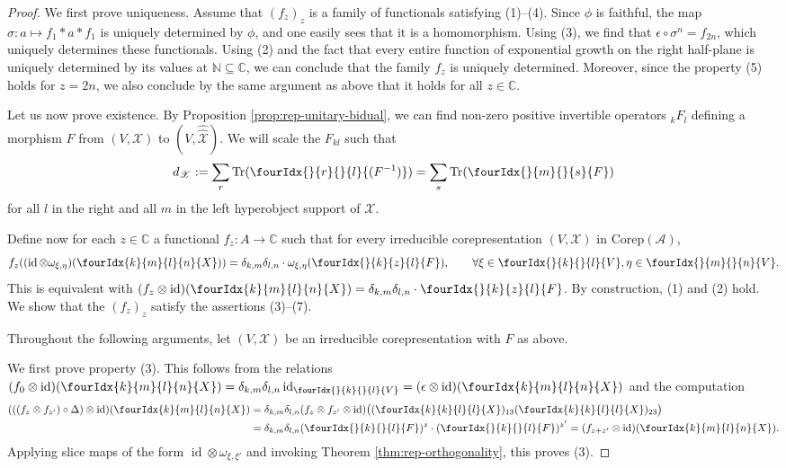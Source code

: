\documentclass[10pt]{article}
\DeclareMathOperator{\id}{id}
\newcommand{\dualco}[1]{\hat{#1}}
\newcommand{\Corep}{\mathrm{Corep}}
\newcommand{\C}{\mathbb{C}}
\newcommand{\N}{\mathbb{N}}
\newcommand{\Tr}{\mathrm{Tr}}
\newcommand{\GrDA}[3]{{}_{#2}#1_{#3}} %
\newcommand{\Gr}[5]{\fourIdx{#2}{#4}{#3}{#5}{#1}}%
\newcommand{\Gru}[3]{\Gr{#1}{}{}{#2}{#3}}
\theoremstyle{definition}
\numberwithin{equation}{section}
\begin{document}
\begin{proof}
  We first prove uniqueness.  Assume that $(f_{z})_{z}$ is a family of
  functionals satisfying (1)--(4).  Since $\phi$ is faithful, the map
  $\sigma\colon a \mapsto f_{1} \ast a \ast f_{1}$ is uniquely
  determined by $\phi$, and one easily sees that it is a homomorphism. Using
  (3), we find that $\epsilon \circ \sigma^n=f_{2n}$, which uniquely determines these functionals. Using (2) and the
  fact that every entire function of exponential growth on the right
  half-plane is uniquely determined by its values at $\N \subseteq \C$, we can conclude that the family $f_{z}$ is uniquely determined. Moreover, since the property (5) holds for $z = 2n$, we also conclude by the same argument as above that it holds for all $z\in \C$.

  Let us now prove existence.  By  Proposition \ref{prop:rep-unitary-bidual}, we can find non-zero positive invertible operators $\GrDA{F}{k}{l}$ defining a morphism $F$  from $(V,\mathscr{X})$ to
    $(V, \dualco{\dualco{\mathscr{X}}})$. We will scale the $F_{kl}$ such that
    \[d_{\mathscr{X}}:= \sum_{r} \Tr(\Gru{(F^{-1})}{r}{l}) = \sum_{s}
      \Tr(\Gru{F}{m}{s})\]
    for all $l$ in the right and all $m$ in the left hyperobject support of $\mathscr{X}$.
  
  Define now for each $z\in \C$ a functional $f_{z} \colon A \to \C$ such
  that for every 
  irreducible  corepresentation
  $(V,\mathscr{X})$ in $\Corep(\mathscr{A})$, \[ f_{z}((\id \otimes \omega_{\xi,\eta})(\Gr{X}{k}{l}{m}{n})) =
      \delta_{k,m}\delta_{l,n} \cdot
      \omega_{\xi,\eta}(\Gr{F}{}{z}{k}{l}), \qquad \forall \xi \in \Gru{V}{k}{l},\eta \in
      \Gru{V}{m}{n}.\] This is equivalent with $(f_{z} \otimes \id)(\Gr{X}{k}{l}{m}{n}) =
      \delta_{k,m}\delta_{l,n} \cdot \Gr{F}{}{z}{k}{l}$. By
    construction, (1) and (2) hold. We show that the $(f_{z})_{z}$ satisfy the
    assertions (3)--(7). 

        Throughout the following arguments, let 
    $(V,\mathscr{X})$ be an  irreducible corepresentation
 with $F$ as above.

    We first prove property (3). This follows from the relations $(f_{0}  \otimes \id)(\Gr{X}{k}{l}{m}{n}) =
      \delta_{k,m}\delta_{l,n} \id_{\Gru{V}{k}{l}} =
      (\epsilon \otimes \id)(\Gr{X}{k}{l}{m}{n})$ and the computation
    \begin{align*}
      (((f_{z}\otimes f_{z'})\circ \Delta) \otimes
      \id)(\Gr{X}{k}{l}{m}{n}) &=  \delta_{k,m}\delta_{l,n}(f_{z} \otimes f_{z'} \otimes
      \id)\big((\Gr{X}{k}{l}{k}{l})_{13}
      (\Gr{X}{k}{l}{k}{l})_{23}\big) \\
      &=  \delta_{k,m}\delta_{l,n}(\Gru{F}{k}{l})^{z}  \cdot (\Gru{F}{k}{l})^{z'} = (f_{z+z'} \otimes \id)(\Gr{X}{k}{l}{m}{n}).
    \end{align*}
    Applying slice maps of the form $\id
    \otimes \omega_{\xi,\xi'}$ and invoking Theorem \ref{thm:rep-orthogonality}, this proves (3).


\end{proof}
\end{document}

